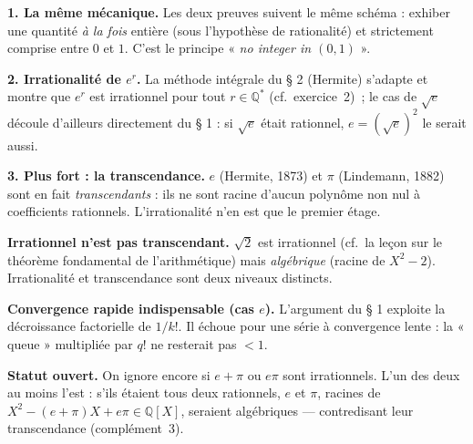 \begin{mdframed}[style=exbar]
  \textbf{1. La même mécanique.}\enspace%
  Les deux preuves suivent le même schéma : exhiber une quantité \emph{à la fois}
  entière (sous l'hypothèse de rationalité) et strictement comprise entre $0$
  et $1$. C'est le principe « \emph{no integer in $(0,1)$} ».

  \smallskip\noindent
  \textbf{2. Irrationalité de $e^r$.}\enspace%
  La méthode intégrale du § 2 (Hermite) s'adapte et montre que $e^r$ est
  irrationnel pour tout $r \in \mathbb{Q}^*$ (cf.\ exercice~2)~; le cas de
  $\sqrt{e}$ découle d'ailleurs directement du § 1 : si $\sqrt{e}$ était
  rationnel, $e = {(\sqrt{e})}^2$ le serait aussi.

  \smallskip\noindent
  \textbf{3. Plus fort : la transcendance.}\enspace%
  $e$ (Hermite, 1873) et $\pi$ (Lindemann, 1882) sont en fait
  \emph{transcendants} : ils ne sont racine d'aucun polynôme non nul à
  coefficients rationnels. L'irrationalité n'en est que le premier étage.
\end{mdframed}


\begin{mdframed}[style=cexbar]
  \textbf{Irrationnel n'est pas transcendant.}\enspace%
  $\sqrt2$ est irrationnel (cf.\ la leçon sur le théorème fondamental de
  l'arithmétique) mais \emph{algébrique} (racine de $X^2 - 2$).
  Irrationalité et transcendance sont deux niveaux distincts.

  \smallskip\noindent
  \textbf{Convergence rapide indispensable (cas $e$).}\enspace%
  L'argument du § 1 exploite la décroissance factorielle de $1/k!$. Il échoue
  pour une série à convergence lente : la « queue » multipliée par $q!$ ne
  resterait pas $< 1$.

  \smallskip\noindent
  \textbf{Statut ouvert.}\enspace%
  On ignore encore si $e + \pi$ ou $e\pi$ sont irrationnels. L'un des deux au
  moins l'est : s'ils étaient tous deux rationnels, $e$ et $\pi$, racines de
  $X^2 - (e+\pi)X + e\pi \in \mathbb{Q}[X]$, seraient algébriques —
  contredisant leur transcendance (complément~3).
\end{mdframed}

\exolabel

